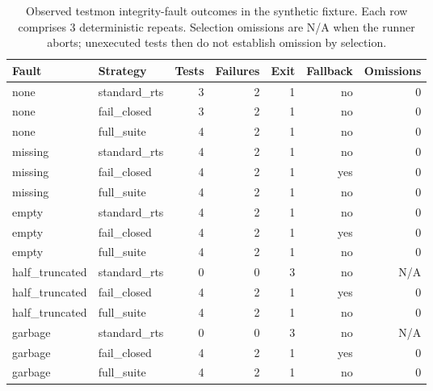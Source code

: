 \begin{table}[t]
\centering
\caption{Observed testmon integrity-fault outcomes in the synthetic fixture. Each row comprises 3 deterministic repeats. Selection omissions are N/A when the runner aborts; unexecuted tests then do not establish omission by selection.}
\label{tab:testmon-integrity-pilot}
\begin{tabular}{llrrrrr}
\hline
Fault & Strategy & Tests & Failures & Exit & Fallback & Omissions \\
\hline
none & standard\_rts & 3 & 2 & 1 & no & 0 \\
none & fail\_closed & 3 & 2 & 1 & no & 0 \\
none & full\_suite & 4 & 2 & 1 & no & 0 \\
missing & standard\_rts & 4 & 2 & 1 & no & 0 \\
missing & fail\_closed & 4 & 2 & 1 & yes & 0 \\
missing & full\_suite & 4 & 2 & 1 & no & 0 \\
empty & standard\_rts & 4 & 2 & 1 & no & 0 \\
empty & fail\_closed & 4 & 2 & 1 & yes & 0 \\
empty & full\_suite & 4 & 2 & 1 & no & 0 \\
half\_truncated & standard\_rts & 0 & 0 & 3 & no & N/A \\
half\_truncated & fail\_closed & 4 & 2 & 1 & yes & 0 \\
half\_truncated & full\_suite & 4 & 2 & 1 & no & 0 \\
garbage & standard\_rts & 0 & 0 & 3 & no & N/A \\
garbage & fail\_closed & 4 & 2 & 1 & yes & 0 \\
garbage & full\_suite & 4 & 2 & 1 & no & 0 \\
\hline
\end{tabular}
\end{table}
